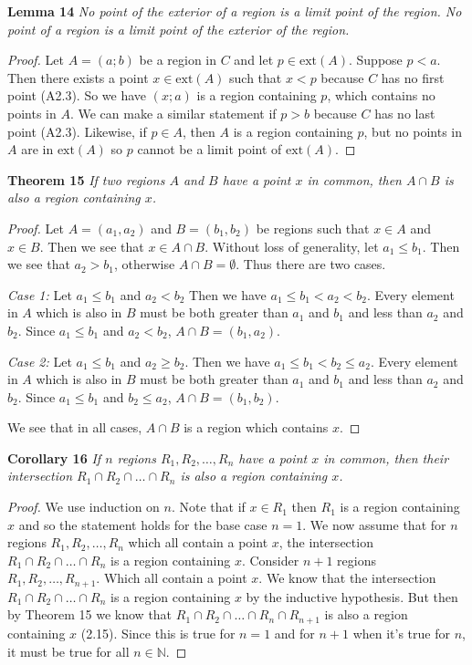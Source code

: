 \documentclass{article}
\begin{document}
\begin{flushleft}
\textbf{Lemma 14}
\textsl{No point of the exterior of a region is a limit point of the region. No point of a region is a limit point of the exterior of the region.}
\begin{proof}
Let $A = (a;b)$ be a region in $C$ and let $p \in \text{ext}(A)$. Suppose $p<a$. Then there exists a point $x \in \text{ext}(A)$ such that $x<p$ because $C$ has no first point (A2.3). So we have $(x;a)$ is a region containing $p$, which contains no points in $A$. We can make a similar statement if $p>b$ because $C$ has no last point (A2.3). Likewise, if $p \in A$, then $A$ is a region containing $p$, but no points in $A$ are in $\text{ext}(A)$ so $p$ cannot be a limit point of $\text{ext}(A)$.
\end{proof}

\textbf{Theorem 15}
\textsl{If two regions $A$ and $B$ have a point $x$ in common, then $A \cap B$ is also a region containing $x$.}
\begin{proof}
Let $A=(a_1,a_2)$ and $B=(b_1,b_2)$ be regions such that $x \in A$ and $x \in B$. Then we see that $x \in A \cap B$. Without loss of generality, let $a_1 \leq b_1$. Then we see that $a_2>b_1$, otherwise $A \cap B = \emptyset$. Thus there are two cases.\newline

\textsl{Case 1:} Let $a_1 \leq b_1$ and $a_2<b_2$ Then we have $a_1 \leq b_1<a_2<b_2$. Every element in $A$ which is also in $B$ must be both greater than $a_1$ and $b_1$ and less than $a_2$ and $b_2$. Since $a_1 \leq b_1$ and $a_2<b_2$, $A \cap B = (b_1,a_2)$.\newline

\textsl{Case 2:} Let $a_1 \leq b_1$ and $a_2 \geq b_2$. Then we have $a_1 \leq b_1<b_2 \leq a_2$. Every element in $A$ which is also in $B$ must be both greater than $a_1$ and $b_1$ and less than $a_2$ and $b_2$. Since $a_1 \leq b_1$ and $b_2 \leq a_2$, $A \cap B = (b_1,b_2)$.\newline

We see that in all cases, $A \cap B$ is a region which contains $x$.
\end{proof}

\textbf{Corollary 16}
\textsl{If $n$ regions $R_1,R_2, \dots ,R_n$ have a point $x$ in common, then their intersection $R_1 \cap R_2 \cap \dots \cap R_n$ is also a region containing $x$.}
\begin{proof}
We use induction on $n$. Note that if $x \in R_1$ then $R_1$ is a region containing $x$ and so the statement holds for the base case $n=1$. We now assume that for $n$ regions $R_1,R_2, \dots ,R_n$ which all contain a point $x$, the intersection $R_1 \cap R_2 \cap \dots \cap R_n$ is a region containing $x$. Consider $n+1$ regions $R_1,R_2, \dots ,R_{n+1}$. Which all contain a point $x$. We know that the intersection $R_1 \cap R_2 \cap \dots \cap R_n$ is a region containing $x$ by the inductive hypothesis. But then by Theorem 15 we know that $R_1 \cap R_2 \cap \dots \cap R_n \cap R_{n+1}$ is also a region containing $x$ (2.15). Since this is true for $n=1$ and for $n+1$ when it's true for $n$, it must be true for all $n \in \mathbb{N}$.
\end{proof}


\end{flushleft}
\end{document}

